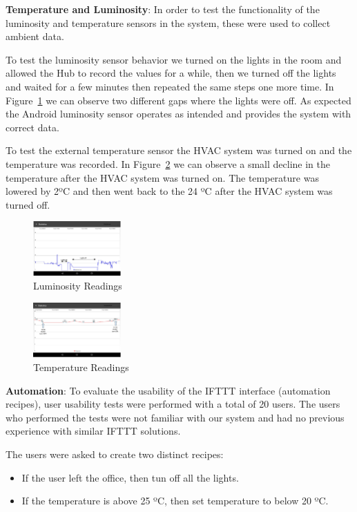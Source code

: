 \documentclass[conference]{IEEEtran}
\begin{document}
\textbf{Temperature and Luminosity}: In order to test the functionality of the luminosity and temperature sensors in the system, these were used to collect ambient data.

To test the luminosity sensor behavior we turned on the lights in the room and allowed the Hub to record the values for a while, then we turned off the lights and waited for a few minutes then repeated the same steps one more time. In Figure~\ref{eval:lights} we can observe two different gaps where the lights were off. As expected the Android luminosity sensor operates as intended and provides the system with correct data. 

To test the external temperature sensor the HVAC system was turned on and the temperature was recorded. In Figure~\ref{eval:temp} we can observe a small decline in the temperature after the HVAC system was turned on. The temperature was lowered by 2ºC and then went back to the 24 ºC after the HVAC system was turned off.

\begin{figure}[]
\centering
\includegraphics[width=0.3\textwidth]{Figures/eval_lights}
\caption{Luminosity Readings}
\label{eval:lights}
\end{figure}

\begin{figure}[]
\centering
\includegraphics[width=0.3\textwidth]{Figures/eval_temp}
\caption{Temperature Readings}
\label{eval:temp}
\end{figure}

\textbf{Automation}: To evaluate the usability of the \ac{IFTTT} interface (automation recipes), user usability tests were performed with a total of 20 users. The users who performed the tests were not familiar with our system and had no previous experience with similar \ac{IFTTT} solutions.

The users were asked to create two distinct recipes:

\begin{itemize}
  \item If the user left the office, then tun off all the lights.
  \item If the temperature is above 25 ºC, then set temperature to below 20 ºC. 
\end{itemize} 
\end{document}
